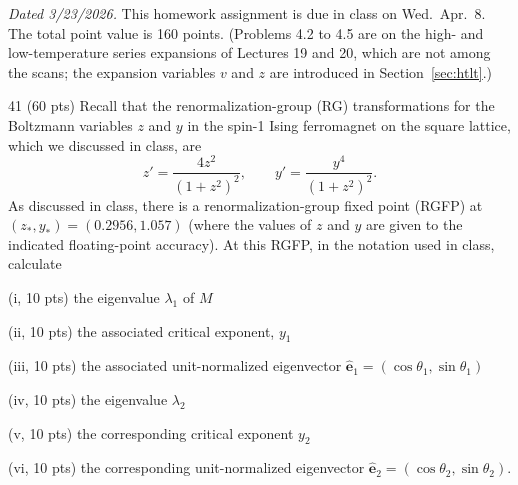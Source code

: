 
\noindent\emph{Dated 3/23/2026.} This homework assignment is due in class on Wed.\ Apr.\ 8. The total point value is
160 points. (Problems 4.2 to 4.5 are on the high- and low-temperature series expansions of Lectures 19 and 20, which
are not among the scans; the expansion variables $v$ and $z$ are introduced in Section~\ref{sec:htlt}.)

\begin{hwproblem}{4}{1}
(60 pts) Recall that the renormalization-group (RG) transformations for the Boltzmann variables $z$ and $y$ in the
spin-1 Ising ferromagnet on the square lattice, which we discussed in class, are
\begin{equation}
  z' = \frac{4z^2}{(1+z^2)^2},\qquad y' = \frac{y^4}{(1+z^2)^2}.
\end{equation}
As discussed in class, there is a renormalization-group fixed point (RGFP) at $(z_*,y_*) = (0.2956,1.057)$ (where the
values of $z$ and $y$ are given to the indicated floating-point accuracy). At this RGFP, in the notation used in class,
calculate
\begin{hwparts}
  \item (i, 10 pts) the eigenvalue $\lambda_1$ of $M$
  \item (ii, 10 pts) the associated critical exponent, $y_1$
  \item (iii, 10 pts) the associated unit-normalized eigenvector $\hat{\mathbf e}_1 = (\cos\theta_1,\sin\theta_1)$
  \item (iv, 10 pts) the eigenvalue $\lambda_2$
  \item (v, 10 pts) the corresponding critical exponent $y_2$
  \item (vi, 10 pts) the corresponding unit-normalized eigenvector $\hat{\mathbf e}_2 = (\cos\theta_2,\sin\theta_2)$.
\end{hwparts}
\end{hwproblem}

